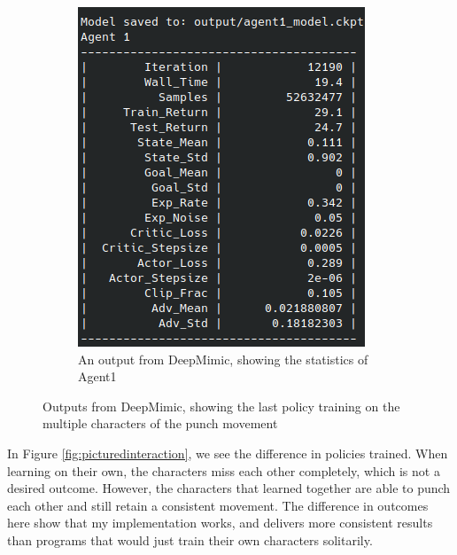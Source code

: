 \documentclass{l4proj}
\begin{document}
\begin{figure}
\begin{subfigure}[b]{0.45\textwidth}
    \includegraphics[width=\textwidth]{images/agent1_later_training.png}
    \caption{An output from DeepMimic, showing the statistics of Agent1}
    \label{fig:multipletrainingresults2}
  \end{subfigure}
  \caption{Outputs from DeepMimic, showing the last policy training on the multiple characters of the punch movement}
  \label{fig:multipletrainingresults}
\end{figure}

In Figure \ref{fig:picturedinteraction}, we see the difference in policies trained. When learning on their own, the characters miss each other completely, which is not a desired outcome. However, the characters that learned together are able to punch each other and still retain a consistent movement. The difference in outcomes here show that my implementation works, and delivers more consistent results than programs that would just train their own characters solitarily.
\end{document}
